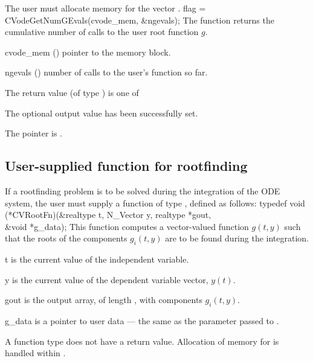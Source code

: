 {
  {\warn} The user must allocate memory for the vector .
}
{
  flag = CVodeGetNumGEvals(cvode\_mem, \&ngevals);
}
{
  The function  returns the cumulative
  number of calls to the user root function $g$.
}
{
  \begin{args}
  \item[cvode\_mem] ()
    pointer to the {\cvode} memory block.
  \item[ngevals] ()
    number of calls to the user's function  so far.
  \end{args}
}
{
  The return value  (of type ) is one of
  \begin{args}
  \item[\Id{CV\_SUCCESS}] 
    The optional output value has been successfully set.
  \item[\Id{CV\_MEM\_NULL}]
    The  pointer is .
  \end{args}
}
{}

\subsection{User-supplied function for rootfinding}\label{ss:root_us}

If a rootfinding problem is to be solved during the integration of the ODE system,
the user must supply a {\C} function of type , defined as follows:
{
  typedef void (*CVRootFn)(&realtype t, N\_Vector y, realtype *gout, \\
                           &void *g\_data);
}
{
  This function computes a vector-valued function $g(t,y)$ such that the roots of
  the  components $g_i(t,y)$ are to be found during the integration.
}
{
  \begin{args}[g\_data]
  \item[t]
    is the current value of the independent variable.
  \item[y]
    is the current value of the dependent variable vector, $y(t)$.
  \item[gout]
    is the output array, of length , with components $g_i(t,y)$.
  \item[g\_data]
    is a pointer to user data --- the same as the       
    parameter passed to .   
  \end{args}
}
{
  A  function type does not have a return value.
}
{
  Allocation of memory for  is handled within {\cvode}.
}

